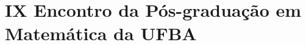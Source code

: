 \documentclass{hipatia}
\begin{document}
 


 




\section{IX Encontro da Pós-graduação em Matemática da UFBA} %
%
%
%
%
\end{document}
